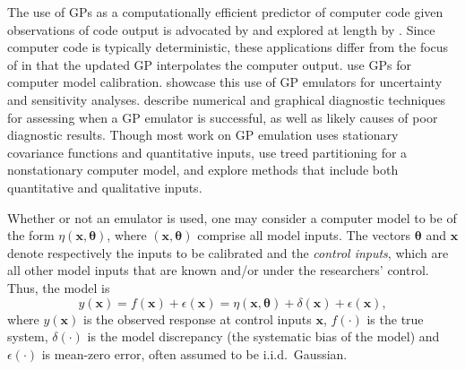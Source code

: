 \documentclass[12pt]{article}
\begin{document}
%
The use of GPs as a computationally efficient predictor of computer code given observations of code output is advocated by \cite{Sacks1989} and explored at length by \cite{Santner2003a}.
%
Since computer code is typically deterministic, these applications differ from the focus of \cite{OHagan1978} in that the updated GP interpolates the computer output. 
%
\cite{Kennedy2001} use GPs for computer model calibration. 
%
\cite{Kennedy2006} showcase this use of GP emulators for uncertainty and sensitivity analyses. 
%
\cite{Bastos2009} describe numerical and graphical diagnostic techniques for assessing when a GP emulator is successful, as well as likely causes of poor diagnostic results. 
%
Though most work on GP emulation uses stationary covariance functions 
and quantitative inputs, 
%
\cite{Gramacy2008} use treed partitioning for a nonstationary computer model, and
%
\cite{Qian2008} explore methods that include both quantitative and qualitative inputs.
%

%
Whether or not an emulator is used, one may consider a computer model to be of the form $\eta(\mathbf x,\boldsymbol \theta)$, where $(\mathbf x,\boldsymbol \theta)$ comprise all model inputs. 
%
The vectors $\boldsymbol \theta$ and $\mathbf x$ denote respectively the inputs to be calibrated and the \emph{control inputs}, which are all other model inputs that are known and/or under the researchers' control. 
%
%
%
Thus, the model is
%
\begin{equation} \label{eq:model_gen}
y(\mathbf x)=f(\mathbf x)+\epsilon(\mathbf x) = \eta(\mathbf x,\boldsymbol \theta) + \delta(\mathbf x)+\epsilon(\mathbf x),
\end{equation} 
%
where $y(\mathbf x)$ is the observed response at control inputs $\mathbf x$, $f(\cdot)$ is the true system, $\delta(\cdot)$ is the model discrepancy (the systematic bias of the model) and $\epsilon(\cdot)$ is mean-zero error, often assumed to be i.i.d.\ Gaussian. 
%
\end{document}
